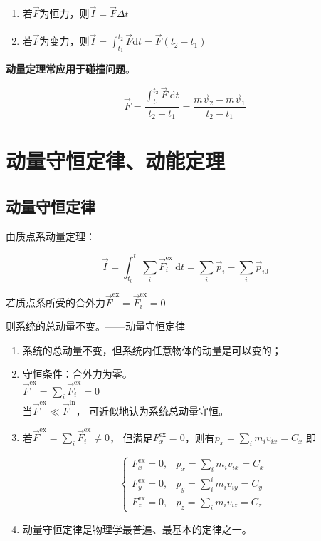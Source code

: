 \documentclass[
	12pt, %
	a4paper, %
]{myLegrandOrangeBook}
\newcommand{\rmd}{\mathrm{d}}
\begin{document}
    \begin{enumerate}
        \item 若\(\overrightarrow{F}\)为恒力，则\(\overrightarrow{I} = \overrightarrow{F} \Delta t\)
        \item 若\(\overrightarrow{F}\)为变力，则\(\overrightarrow{I} =
            \int_{t_1}^{t_2} \overrightarrow{F} \rmd t = \overline{\overrightarrow{F}}\left(t_2-t_1\right)\)
    \end{enumerate}

    \textbf{动量定理常应用于碰撞问题}。

    $$
    \overline{\overrightarrow{F}}=\frac{\int_{t_1}^{t_2} \overrightarrow{F} \mathrm{~d} t}{t_2-t_1}
    =\frac{m \overrightarrow{v}_2-m \overrightarrow{v}_1}{t_2-t_1}
    $$

    \section{动量守恒定律、动能定理}

    \subsection{动量守恒定律}

    由质点系动量定理：

    $$
        \overrightarrow{I}=\int_{t_0}^t \sum_i \overrightarrow{F}_i^{\mathrm{ex}} \mathrm{~d} t=
        \sum_i \overrightarrow{p}_i-\sum_i \overrightarrow{p}_{i 0}
    $$

    若质点系所受的合外力\(\overrightarrow{F}^{\mathrm{ex}} = \overrightarrow{F}_i^{\mathrm{ex}}= 0\)

    则系统的总动量不变。——动量守恒定律

    \begin{enumerate}
        \item 系统的总动量不变，但系统内任意物体的动量是可以变的；
        \item 守恒条件：合外力为零。\\
            \(\overrightarrow{F}^{\mathrm{ex}} = \sum_i \overrightarrow{F}_i^{\mathrm{ex}}= 0\)\\
            当\(\overrightarrow{F}^{\mathrm{ex}} \ll \overrightarrow{F}^{\mathrm{in}}\)，
            可近似地认为系统总动量守恒。
        \item 若\(\overrightarrow{F}^{\mathrm{ex}} = \sum_i \overrightarrow{F}_i^{\mathrm{ex}}\neq 0\)，
            但满足\(F_{x}^{\mathrm{ex}} = 0\)，则有$p_x=\sum_i m_i v_{i x}=C_x$
            即

            \begin{equation}
                \begin{cases}F_x^{\mathrm{ex}}=0, & p_x=\sum_i m_i v_{i x}=C_x \\
                F_y^{\mathrm{ex}}=0, & p_y=\sum_i^i m_i v_{i y}=C_y \\
                F_z^{\mathrm{ex}}=0, & p_z=\sum_i m_i v_{i z}=C_z\end{cases}
            \end{equation}
        \item 动量守恒定律是物理学最普遍、最基本的定律之一。
    \end{enumerate}
\end{document}
